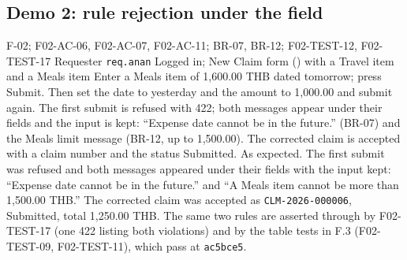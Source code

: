 
\subsection*{Demo 2: rule rejection under the field}

\demofacts
 {F-02; F02-AC-06, F02-AC-07, F02-AC-11; BR-07, BR-12; F02-TEST-12, F02-TEST-17}
 {Requester \texttt{req.anan}}
 {Logged in; New Claim form () with a Travel item and a Meals item}
 {Enter a Meals item of 1,600.00 THB dated tomorrow; press Submit. Then set the date to yesterday and the amount to 1,000.00 and submit again.}
 {The first submit is refused with 422; both messages appear under their fields and the input is kept: ``Expense date cannot be in the future.'' (BR-07) and the Meals limit message (BR-12, up to 1,500.00). The corrected claim is accepted with a claim number and the status Submitted.}
 {As expected. The first submit was refused and both messages appeared under their fields with the input kept: ``Expense date cannot be in the future.'' and ``A Meals item cannot be more than 1,500.00 THB.'' The corrected claim was accepted as \texttt{CLM-2026-000006}, Submitted, total 1,250.00 THB.}
 {The same two rules are asserted through  by F02-TEST-17 (one 422 listing both violations) and by the table tests in F.3 (F02-TEST-09, F02-TEST-11), which pass at \texttt{ac5bce5}.}

